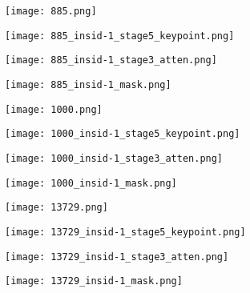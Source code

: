 \begin{figure}[htbp]
	\centering
	\begin{minipage}[t]{\linewidth}
		\centering
		\begin{minipage}[t]{0.23\linewidth}
			\texttt{[image: 885.png]}
		\end{minipage}
		\begin{minipage}[t]{0.23\linewidth}
			\texttt{[image: 885\_insid-1\_stage5\_keypoint.png]}
		\end{minipage}
		\begin{minipage}[t]{0.23\linewidth}
			\texttt{[image: 885\_insid-1\_stage3\_atten.png]}
		\end{minipage}
		\begin{minipage}[t]{0.23\linewidth}
			\texttt{[image: 885\_insid-1\_mask.png]}
		\end{minipage}
		
		\vskip5pt
		\begin{minipage}[t]{0.23\linewidth}
			\texttt{[image: 1000.png]}
		\end{minipage}
		\begin{minipage}[t]{0.23\linewidth}
			\texttt{[image: 1000\_insid-1\_stage5\_keypoint.png]}
		\end{minipage}
		\begin{minipage}[t]{0.23\linewidth}
			\texttt{[image: 1000\_insid-1\_stage3\_atten.png]}
		\end{minipage}
		\begin{minipage}[t]{0.23\linewidth}
			\texttt{[image: 1000\_insid-1\_mask.png]}
		\end{minipage}
		
		\vskip5pt
		\begin{minipage}[t]{0.23\linewidth}
			\texttt{[image: 13729.png]}
		\end{minipage}
		\begin{minipage}[t]{0.23\linewidth}
			\texttt{[image: 13729\_insid-1\_stage5\_keypoint.png]}
		\end{minipage}
		\begin{minipage}[t]{0.23\linewidth}
			\texttt{[image: 13729\_insid-1\_stage3\_atten.png]}
		\end{minipage}
		\begin{minipage}[t]{0.23\linewidth}
			\texttt{[image: 13729\_insid-1\_mask.png]}
		\end{minipage}
		

\end{minipage}
\end{figure}
